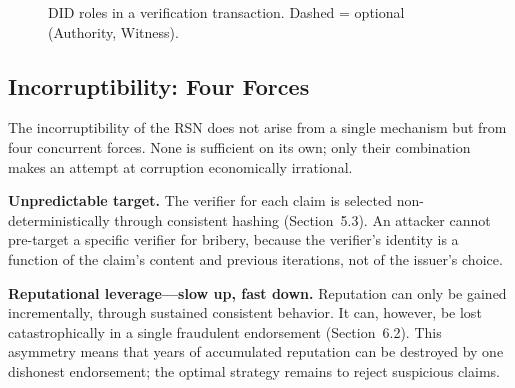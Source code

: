 \documentclass[11pt,a4paper,twocolumn]{article}
\begin{document}
\begin{figure}[ht]
\centering
{}
\caption{DID roles in a verification transaction. Dashed = optional (Authority, Witness).}
\label{fig:roles}
\end{figure}

\subsection{Incorruptibility: Four Forces}

The incorruptibility of the RSN does not arise from a single mechanism but from four concurrent forces. None is sufficient on its own; only their combination makes an attempt at corruption economically irrational.

\textbf{Unpredictable target.} The verifier for each claim is selected non-deterministically through consistent hashing (Section~5.3). An attacker cannot pre-target a specific verifier for bribery, because the verifier's identity is a function of the claim's content and previous iterations, not of the issuer's choice.

\textbf{Reputational leverage---slow up, fast down.} Reputation can only be gained incrementally, through sustained consistent behavior. It can, however, be lost catastrophically in a single fraudulent endorsement (Section~6.2). This asymmetry means that years of accumulated reputation can be destroyed by one dishonest endorsement; the optimal strategy remains to reject suspicious claims.
\end{document}
